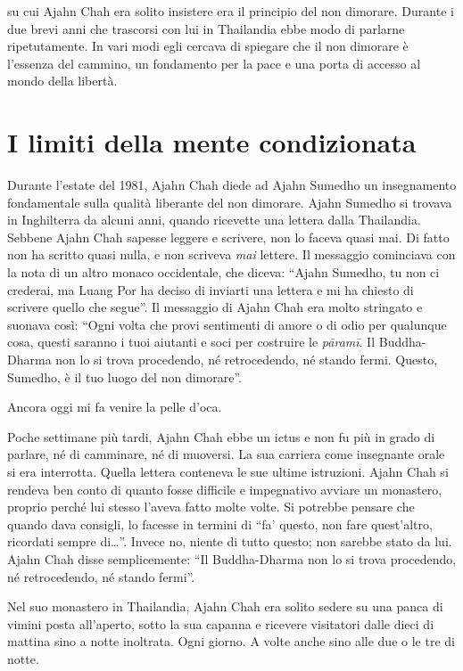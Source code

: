 
\vspace*{-0.3em}
 su cui Ajahn Chah era solito insistere era il principio del non dimorare. Durante i due brevi anni che trascorsi con lui in Thailandia ebbe modo di parlarne ripetutamente. In vari modi egli cercava di spiegare che il non dimorare è l'essenza del cammino, un fondamento per la pace e una porta di accesso al mondo della libertà.

\vspace*{-1.2em}
\section*{I limiti della mente condizionata}

Durante l'estate del 1981, Ajahn Chah diede ad Ajahn Sumedho un insegnamento fondamentale sulla qualità liberante del non dimorare. Ajahn Sumedho si trovava in Inghilterra da alcuni anni, quando ricevette una lettera dalla Thailandia. Sebbene Ajahn Chah sapesse leggere e scrivere, non lo faceva quasi mai. Di fatto non ha scritto quasi nulla, e non scriveva \textit{mai} lettere. Il messaggio cominciava con la nota di un altro monaco occidentale, che diceva: ``Ajahn Sumedho, tu non ci crederai, ma Luang Por ha deciso di inviarti una lettera e mi ha chiesto di scrivere quello che segue''. Il messaggio di Ajahn Chah era molto stringato e suonava così: ``Ogni volta che provi sentimenti di amore o di odio per qualunque cosa, questi saranno i tuoi aiutanti e soci per costruire le \textit{pāramī}. Il Buddha-Dharma non lo si trova procedendo, né retrocedendo, né stando fermi. Questo, Sumedho, è il tuo luogo del non dimorare''.

Ancora oggi mi fa venire la pelle d'oca.

Poche settimane più tardi, Ajahn Chah ebbe un ictus e non fu più in grado di parlare, né di camminare, né di muoversi. La sua carriera come insegnante orale si era interrotta. Quella lettera conteneva le sue ultime istruzioni. Ajahn Chah si rendeva ben conto di quanto fosse difficile e impegnativo avviare un monastero, proprio perché lui stesso l'aveva fatto molte volte. Si potrebbe pensare che quando dava consigli, lo facesse in termini di ``fa' questo, non fare quest'altro, ricordati sempre di\ldots{}''. Invece no, niente di tutto questo; non sarebbe stato da lui. Ajahn Chah disse semplicemente: ``Il Buddha-Dharma non lo si trova procedendo, né retrocedendo, né stando fermi''.

Nel suo monastero in Thailandia, Ajahn Chah era solito sedere su una panca di vimini posta all'aperto, sotto la sua capanna e ricevere visitatori dalle dieci di mattina sino a notte inoltrata. Ogni giorno. A volte anche sino alle due o le tre di notte.


